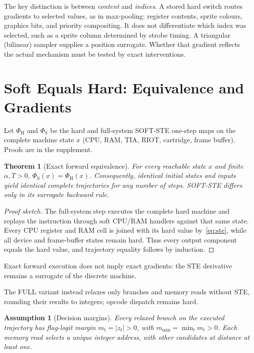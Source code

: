 \documentclass[letterpaper]{article} %
\newtheorem{theorem}{Theorem}
\newtheorem{assumption}{Assumption}
\begin{document}
The key distinction is between \emph{content} and
\emph{indices}. A stored hard switch routes gradients
to selected values, as in max-pooling: register
contents, sprite colours, graphics bits, and priority
compositing. It does not differentiate which index was
selected, such as a sprite column determined by strobe
timing. A triangular (bilinear) sampler
\citep{jaderberg2015spatial} supplies a position
surrogate. Whether that gradient reflects the actual
mechanism must be tested by exact interventions.


\section{Soft Equals Hard: Equivalence and Gradients}

Let $\Phi_{\mathrm{H}}$ and $\Phi_{\mathrm{S}}$ be the
hard and full-system SOFT-STE one-step maps on the
complete machine state $x$ (CPU, RAM, TIA, RIOT,
cartridge, frame buffer). Proofs are in the supplement.

\begin{theorem}[Exact forward equivalence]
\label{thm:exact}
For every reachable state $x$ and finite $\alpha,T>0$,
$\Phi_{\mathrm{S}}(x)=\Phi_{\mathrm{H}}(x)$.
Consequently, identical initial states and inputs yield
identical complete trajectories for any number of steps.
SOFT-STE differs only in its surrogate backward rule.
\end{theorem}

\begin{proof}[Proof sketch]
The full-system step executes the complete hard machine
and replays the instruction through soft CPU/RAM handlers
against that same state. Every CPU register and RAM cell
is joined with its hard value by~\eqref{eq:ste}, while
all device and frame-buffer states remain hard.
Thus every output component equals the hard value,
and trajectory equality follows by induction.
\end{proof}

Exact forward execution does not imply exact gradients:
the STE derivative remains a surrogate of the
discrete machine.

The FULL variant instead relaxes only branches and
memory reads without STE, rounding their results
to integers; opcode dispatch remains hard.

\begin{assumption}[Decision margins]
\label{ass:dm}
Every relaxed branch on the executed trajectory has
flag-logit margin $m_t=|z_t|>0$, with
$m_{\min}=\min_t m_t>0$. Each memory read selects
a unique integer address, with other candidates
at distance at least one.
\end{assumption}
\end{document}
